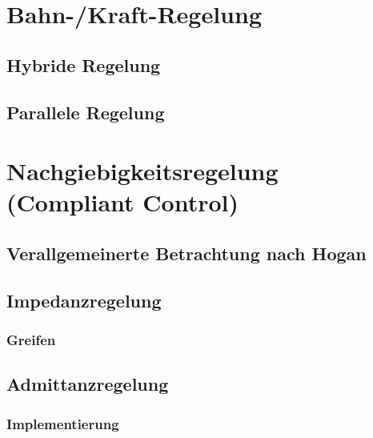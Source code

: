 \documentclass[a4paper, 11pt, accentcolor = tud3b]{tudreport}
\begin{document}

		\section{Bahn-/Kraft-Regelung}
			\subsection{Hybride Regelung} %

			\subsection{Parallele Regelung} %

		\section{Nachgiebigkeitsregelung (Compliant Control)} %

			\subsection{Verallgemeinerte Betrachtung nach Hogan} %

			\subsection{Impedanzregelung} %

				\subsubsection{Greifen} %

			\subsection{Admittanzregelung} %

				\subsubsection{Implementierung} %
\end{document}
